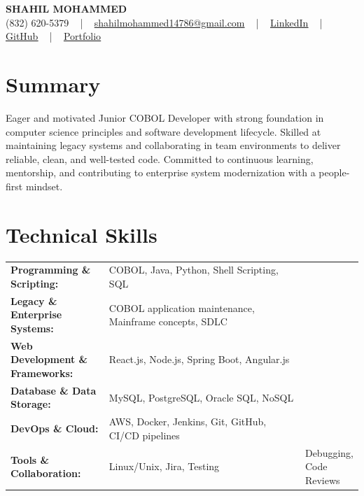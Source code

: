 \documentclass[letterpaper,11pt]{article}
\begin{document}
\begin{center}
    {\fontsize{14pt}{12pt}\selectfont \textbf{\MakeUppercase{Shahil Mohammed}}}\\ \vspace{2pt}
    \fontsize{10pt}{12pt}\selectfont (832) 620-5379 ~ | ~ \href{mailto:shahilmohammed14786@gmail.com}{shahilmohammed14786@gmail.com} ~ | ~  
    \href{https://www.linkedin.com/in/shahil-mohammed-9652931a1/}{\color{blue}\underline{LinkedIn}}  ~ | ~ 
    \href{https://github.com/freakbeast14}{\color{blue}\underline{GitHub}} ~ | ~ 
    \href{https://shahil-mohammed.netlify.app/}{\color{blue}\underline{Portfolio}}
    \vspace{-8pt}
\end{center}

\section{Summary}
\fontsize{9pt}{10pt}\selectfont
Eager and motivated Junior COBOL Developer with strong foundation in computer science principles and software development lifecycle. Skilled at maintaining legacy systems and collaborating in team environments to deliver reliable, clean, and well-tested code. Committed to continuous learning, mentorship, and contributing to enterprise system modernization with a people-first mindset.
 \vspace{-5pt}
 
\section{Technical Skills}
        \vspace{-14pt}
        \begin{table}[h]
            \fontsize{9pt}{10pt}\selectfont
            \begin{tabular}{p{0.3\linewidth} p{0.7\linewidth}}
                \textbf{Programming \& Scripting:} & COBOL, Java, Python, Shell Scripting, SQL \\
                \textbf{Legacy \& Enterprise Systems:} & COBOL application maintenance, Mainframe concepts, SDLC \\
                \textbf{Web Development \& Frameworks:} & React.js, Node.js, Spring Boot, Angular.js \\
                \textbf{Database \& Data Storage:} & MySQL, PostgreSQL, Oracle SQL, NoSQL \\
                \textbf{DevOps \& Cloud:} & AWS, Docker, Jenkins, Git, GitHub, CI/CD pipelines \\
                \textbf{Tools \& Collaboration:} & Linux/Unix, Jira, Testing & Debugging, Code Reviews \\
            \end{tabular}
        \end{table}
 \vspace{-15pt}
 
\end{document}

